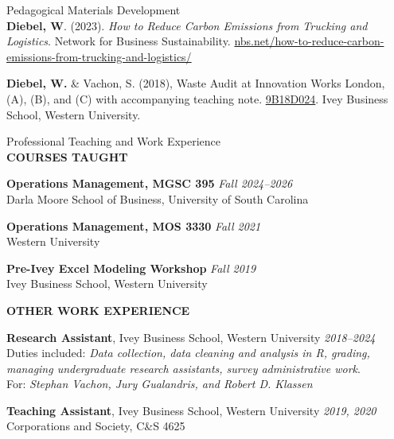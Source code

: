 \documentclass{resume} %
\begin{document}
\begin{rSection}{Pedagogical Materials Development}
\ \\
\textbf{Diebel, W}. (2023). \textit{How to Reduce Carbon Emissions from Trucking and Logistics}. Network for Business Sustainability. \href{https://nbs.net/how-to-reduce-carbon-emissions-from-trucking-and-logistics/}{nbs.net/how-to-reduce-carbon-emissions-from-trucking-and-logistics/}

\textbf{Diebel, W.} \& Vachon, S. (2018), Waste Audit at Innovation Works London, (A), (B), and (C) with accompanying teaching note. \href{https://www.iveypublishing.ca/s/product/waste-audit-at-innovation-works-london-a/01t5c00000CwoV3AAJ}{9B18D024}. Ivey Business School, Western University.

\end{rSection}
\begin{rSection}{Professional Teaching and Work Experience}
\ \\
\MakeUppercase{\bf{Courses Taught}}

{\bf Operations Management, MGSC 395} \hfill {\em Fall 2024--2026} \\
{Darla Moore School of Business, University of South Carolina}

{\bf Operations Management, MOS 3330} \hfill {\em Fall 2021} \\
{Western University}

{\bf Pre-Ivey Excel Modeling Workshop} \hfill {\em Fall 2019}\\
{Ivey Business School, Western University} 

\MakeUppercase{\bf{Other work experience}}

{\bf Research Assistant}, Ivey Business School, Western University \hfill {\em 2018--2024}\\
Duties included: \textit{Data collection, data cleaning and analysis in R, grading, \\ managing undergraduate research assistants, survey administrative work}.\\
For: \textit{Stephan Vachon, Jury Gualandris, and Robert D. Klassen}

{\bf Teaching Assistant}, Ivey Business School, Western University \hfill {\em 2019, 2020}\\
Corporations and Society, C\&S 4625

\end{rSection}
\end{document}
